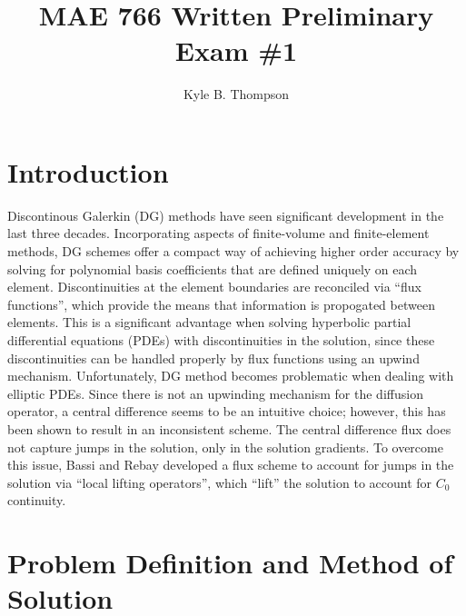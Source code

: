 \documentclass[a4paper]{report}
\title{MAE 766 Written Preliminary Exam \#1}
\author{ Kyle B. Thompson }
\begin{document}
\maketitle

\section{Introduction}
Discontinous Galerkin (DG) methods have seen significant development in the last
three decades.  Incorporating aspects of finite-volume and finite-element
methods, DG schemes offer a compact way of achieving higher order accuracy by
solving for polynomial basis coefficients that are defined uniquely on each
element.  Discontinuities at the element boundaries are reconciled via ``flux
functions'', which provide the means that information is propogated between
elements.  This is a significant advantage when solving hyperbolic partial
differential equations (PDEs) with discontinuities in the solution, since these
discontinuities can be handled properly by flux functions using an upwind
mechanism.  Unfortunately, DG method becomes problematic when dealing with
elliptic PDEs.  Since there is not an upwinding mechanism for the diffusion
operator, a central difference seems to be an intuitive choice; however, this
has been shown to result in an inconsistent scheme. The central difference flux
does not capture jumps in the solution, only in the solution gradients.  To
overcome this issue, Bassi and Rebay developed a flux scheme to account for
jumps in the solution via ``local lifting operators'', which ``lift'' the
solution to account for $C_0$ continuity.

\section{Problem Definition and Method of Solution}
\end{document}
